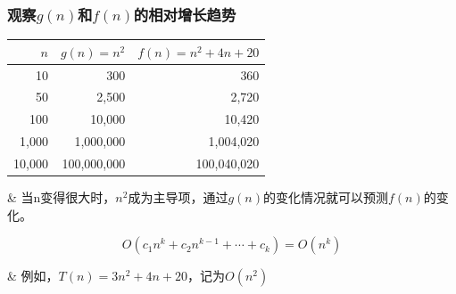 \begin{frame}[fragile]
  \frametitle{观察$g(n)$和$f(n)$的相对增长趋势}

  \begin{center}
    \begin{tabular}{| r | r | r |}
      \hline
      $n$ & $g(n)=n^2$ & $f(n)=n^2+4n+20$ \\ \hline
      10 & 300 & 360  \\ \hline
      50 & 2,500 & 2,720  \\ \hline
      100 & 10,000 & 10,420  \\ \hline
      1,000 & 1,000,000 & 1,004,020  \\ \hline
      10,000 & 100,000,000 & 100,040,020  \\ \hline
    \end{tabular}
  \end{center}

  \begin{easylist}
    & 当n变得很大时，$n^2$成为主导项，通过$g(n)$的变化情况就可以预测$f(n)$的变化。

    \[O(c_1 n^k + c_2 n^{k-1} + \cdots + c_k) = O(n^k)\]

    & 例如，$T(n)=3n^ 2+ 4n + 20$，记为$O(n^2)$
  \end{easylist}
\end{frame}

